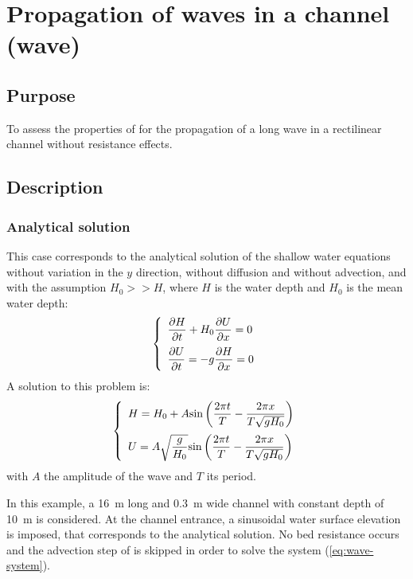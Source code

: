 \chapter{Propagation of waves in a channel (wave)}

\section{Purpose}
To assess the properties of  for the propagation of a long
wave in a rectilinear channel without resistance effects.
\section{Description}

\subsection{Analytical solution}
This case corresponds to the analytical solution of the shallow water equations
without variation in the $y$ direction, without diffusion and without advection, and
with the assumption $H_0 >> H$, where $H$ is the water depth and $H_0$ is the mean water depth:
\begin{equation}\label{eq:wave-system}
    \left\{\begin{array}{l}
    \dfrac{\partial H}{\partial t} + H_0 \dfrac{\partial U}{\partial x}=0\medskip\\
    \dfrac{\partial U}{\partial t} = -g \dfrac{\partial H}{\partial x}=0
  \end{array}\right.
\end{equation}
A solution to this problem is:
\begin{equation}
    \left\{\begin{array}{l}
    H = H_0 + A\text{sin}\left(\dfrac{2\pi t}{T} - \dfrac{2\pi x}{T\sqrt{gH_0}}\right)\medskip\\
    U = A\sqrt{\dfrac{g}{H_0}} \text{sin}\left(\dfrac{2\pi t}{T} - \dfrac{2\pi x}{T\sqrt{gH_0}}\right)
  \end{array}\right.
\end{equation}
with $A$ the amplitude of the wave and $T$ its period.

In this example, a 16~m long and 0.3~m wide channel with constant depth
of 10~m is considered. At the channel entrance, a sinusoidal water surface
elevation is imposed, that corresponds to the analytical solution.
No bed resistance occurs and the advection step of  is skipped in order
to solve the system (\ref{eq:wave-system}).

